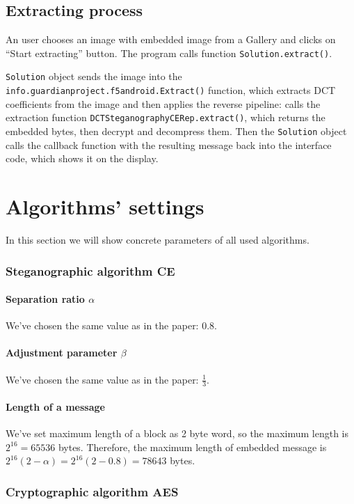 \subsection{Extracting process}

An user chooses an image with embedded image from a Gallery and clicks on ``Start extracting'' button.
The program calls function \texttt{Solution.extract()}.

\texttt{Solution} object sends the image into the \texttt{info.guardianproject.f5android.Extract()} function,
which extracts DCT coefficients from the image and then applies the reverse pipeline: calls the extraction
function \texttt{DCTSteganographyCERep.extract()}, which returns the embedded bytes, then decrypt
and decompress them. Then the \texttt{Solution} object calls the callback function with the resulting
message back into the interface code, which shows it on the display.

\section{Algorithms' settings}
In this section we will show concrete parameters of all used algorithms.

\subsubsection{Steganographic algorithm CE}

\paragraph{Separation ratio $\alpha$} We've chosen the same value as in the 
paper: $0.8$.

\paragraph{Adjustment parameter $\beta$} We've chosen the same value as in the paper: $\frac{1}{3}$.

\paragraph{Length of a message}
We've set maximum length of a block as 2 byte word, so the maximum length is 
$2^{16} = 65536$ bytes. Therefore, the maximum length of embedded message is 
$2^{16} (2 - \alpha) = 2^{16} (2 - 0.8) = 78643$ bytes.

\subsubsection{Cryptographic algorithm AES}

